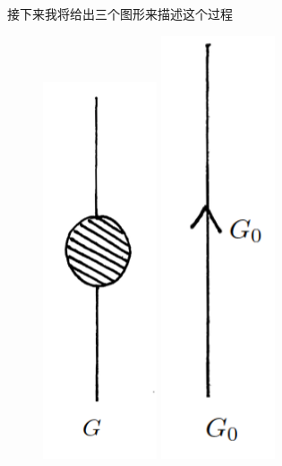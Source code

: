 \documentclass{article}
\begin{document}
接下来我将给出三个图形来描述这个过程
\begin{figure}[H]
    \begin{minipage}{0.3\textwidth}
        \centering
        \includegraphics[width = 0.3\textwidth]{figure/总的格林函数.png}
    \end{minipage}
    \hfill
    \begin{minipage}{0.3\textwidth}
        \centering
        \includegraphics[width = 0.3\textwidth]{figure/自由粒子格林函数.png}

\end{minipage}
\end{figure}
\end{document}
